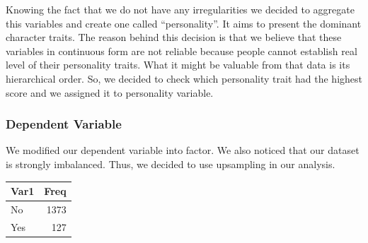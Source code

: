 \documentclass[
]{article}
\newenvironment{Shaded}{\begin{snugshade}}{\end{snugshade}}
\newcommand{\DataTypeTok}[1]{\textcolor[rgb]{0.13,0.29,0.53}{#1}}
\newcommand{\DecValTok}[1]{\textcolor[rgb]{0.00,0.00,0.81}{#1}}
\newcommand{\KeywordTok}[1]{\textcolor[rgb]{0.13,0.29,0.53}{\textbf{#1}}}
\newcommand{\NormalTok}[1]{#1}
\newcommand{\OperatorTok}[1]{\textcolor[rgb]{0.81,0.36,0.00}{\textbf{#1}}}
\newcommand{\OtherTok}[1]{\textcolor[rgb]{0.56,0.35,0.01}{#1}}
\newcommand{\StringTok}[1]{\textcolor[rgb]{0.31,0.60,0.02}{#1}}
\begin{document}
Knowing the fact that we do not have any irregularities we decided to
aggregate this variables and create one called ``personality''. It aims
to present the dominant character traits. The reason behind this
decision is that we believe that these variables in continuous form are
not reliable because people cannot establish real level of their
personality traits. What it might be valuable from that data is its
hierarchical order. So, we decided to check which personality trait had
the highest score and we assigned it to personality variable.

\begin{Shaded}
\end{Shaded}

\hypertarget{dependent-variable}{%
\subsubsection{Dependent Variable}\label{dependent-variable}}

We modified our dependent variable into factor. We also noticed that our
dataset is strongly imbalanced. Thus, we decided to use upsampling in
our analysis.

\begin{Shaded}
\end{Shaded}

\begin{longtable}[]{@{}lr@{}}
\toprule
Var1 & Freq\tabularnewline
\midrule
\endhead
No & 1373\tabularnewline
Yes & 127\tabularnewline
\bottomrule
\end{longtable}

\begin{Shaded}
\end{Shaded}
\end{document}
